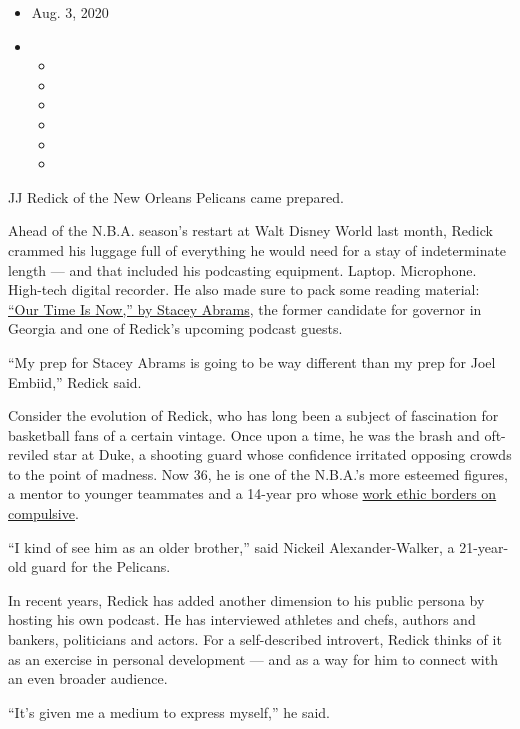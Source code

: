 \begin{itemize}
\item
  Aug. 3, 2020
\item
  \begin{itemize}
  \item
  \item
  \item
  \item
  \item
  \item
  \end{itemize}
\end{itemize}

JJ Redick of the New Orleans Pelicans came prepared.

Ahead of the N.B.A. season's restart at Walt Disney World last month,
Redick crammed his luggage full of everything he would need for a stay
of indeterminate length --- and that included his podcasting equipment.
Laptop. Microphone. High-tech digital recorder. He also made sure to
pack some reading material:
\href{https://www.nytimes.com/2020/06/04/books/review/our-time-is-now-stacey-abrams.html}{``Our
Time Is Now,'' by Stacey Abrams}, the former candidate for governor in
Georgia and one of Redick's upcoming podcast guests.

``My prep for Stacey Abrams is going to be way different than my prep
for Joel Embiid,'' Redick said.

Consider the evolution of Redick, who has long been a subject of
fascination for basketball fans of a certain vintage. Once upon a time,
he was the brash and oft-reviled star at Duke, a shooting guard whose
confidence irritated opposing crowds to the point of madness. Now 36, he
is one of the N.B.A.'s more esteemed figures, a mentor to younger
teammates and a 14-year pro whose
\href{https://www.nytimes.com/2018/03/21/sports/jj-redick-sixers.html}{work
ethic borders on compulsive}.

``I kind of see him as an older brother,'' said Nickeil
Alexander-Walker, a 21-year-old guard for the Pelicans.

In recent years, Redick has added another dimension to his public
persona by hosting his own podcast. He has interviewed athletes and
chefs, authors and bankers, politicians and actors. For a self-described
introvert, Redick thinks of it as an exercise in personal development
--- and as a way for him to connect with an even broader audience.

``It's given me a medium to express myself,'' he said.

